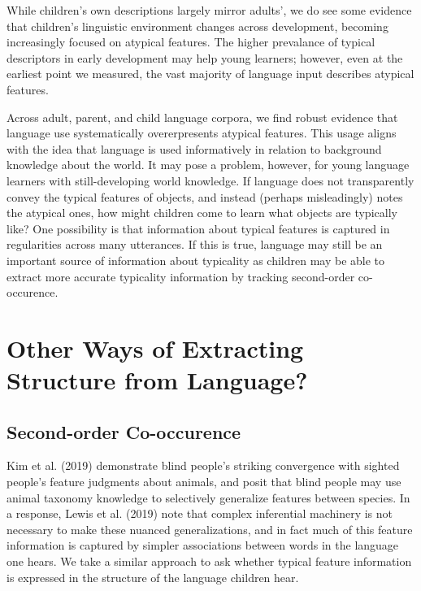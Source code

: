 \documentclass[10pt, letterpaper]{article}
\begin{document}
While children's own descriptions largely mirror adults', we do see some
evidence that children's linguistic environment changes across
development, becoming increasingly focused on atypical features. The
higher prevalance of typical descriptors in early development may help
young learners; however, even at the earliest point we measured, the
vast majority of language input describes atypical features.

Across adult, parent, and child language corpora, we find robust
evidence that language use systematically overerpresents atypical
features. This usage aligns with the idea that language is used
informatively in relation to background knowledge about the world. It
may pose a problem, however, for young language learners with
still-developing world knowledge. If language does not transparently
convey the typical features of objects, and instead (perhaps
misleadingly) notes the atypical ones, how might children come to learn
what objects are typically like? One possibility is that information
about typical features is captured in regularities across many
utterances. If this is true, language may still be an important source
of information about typicality as children may be able to extract more
accurate typicality information by tracking second-order co-occurence.

\hypertarget{other-ways-of-extracting-structure-from-language}{%
\section{Other Ways of Extracting Structure from
Language?}\label{other-ways-of-extracting-structure-from-language}}

\hypertarget{second-order-co-occurence}{%
\subsection{Second-order Co-occurence}\label{second-order-co-occurence}}

Kim et al. (2019) demonstrate blind people's striking convergence with
sighted people's feature judgments about animals, and posit that blind
people may use animal taxonomy knowledge to selectively generalize
features between species. In a response, Lewis et al. (2019) note that
complex inferential machinery is not necessary to make these nuanced
generalizations, and in fact much of this feature information is
captured by simpler associations between words in the language one
hears. We take a similar approach to ask whether typical feature
information is expressed in the structure of the language children hear.
\end{document}
